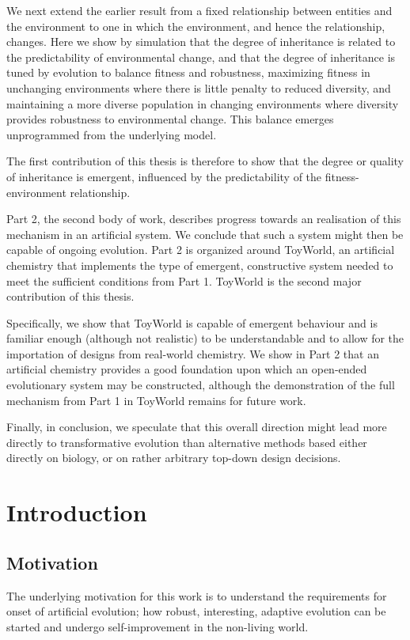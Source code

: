 \documentclass[]{report}
\begin{document}
We next extend the earlier result from a fixed relationship between entities and the environment to one in which the environment, and hence the relationship, changes. Here we show by simulation that the degree of inheritance is related to the predictability of environmental change, and that the degree of inheritance is tuned by evolution to balance fitness and robustness, maximizing fitness in unchanging environments where there is little penalty to reduced diversity, and maintaining a more diverse population in changing environments where diversity provides robustness to environmental change. This balance emerges unprogrammed from the underlying model.

The first contribution of this thesis is therefore to show that the degree or quality of inheritance is emergent, influenced by the predictability of the fitness-environment relationship. 

Part 2, the second body of work, describes progress towards an realisation of this mechanism in an artificial system. We conclude that such a system might then be capable of ongoing evolution. Part 2 is organized around ToyWorld, an artificial chemistry that implements the type of emergent, constructive system needed to meet the sufficient conditions from Part 1. ToyWorld is the second major contribution of this thesis.

Specifically, we show that ToyWorld is capable of emergent behaviour and is familiar enough (although not realistic) to be understandable and to allow for the importation of designs from real-world chemistry. We show in Part 2 that an artificial chemistry provides a good foundation upon which an open-ended evolutionary system may be constructed, although the demonstration of the full mechanism from Part 1 in ToyWorld remains for future work.

Finally, in conclusion, we speculate that this overall direction might lead more directly to transformative evolution than alternative methods based either directly on biology, or on rather arbitrary top-down design decisions.

\chapter{Introduction}

\section{Motivation}
The underlying motivation for this work is to understand the requirements for onset of artificial evolution; how robust, interesting, adaptive evolution can be started and undergo self-improvement in the non-living world.
\end{document}
